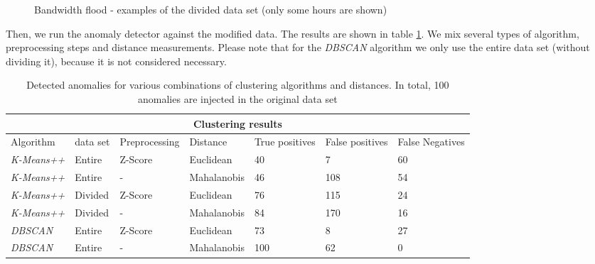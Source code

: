 \documentclass[12pt,a4paper,cucitura]{toptesi}
\begin{document}
\begin{figure}
\caption[Bandwidth flood - divided data set]{Bandwidth flood - examples of the divided data set (only some hours are shown)}
\end{figure}

Then, we run the anomaly detector against the modified data. The results are shown in table \ref{tab-flood}. We mix several types of algorithm, preprocessing steps and distance measurements.
Please note that for the \emph{DBSCAN} algorithm we only use the entire data set (without dividing it), because it is not considered necessary.

\begin{center}
\begin{table}
\begin{tabular}{l|l|l|l|p{1.5cm}|p{1.5cm}|p{1.5cm}}
\hline
\hline
\multicolumn{7}{c}{Clustering results} \\
\hline
Algorithm & data set & Preprocessing & Distance & True positives & False positives & False Negatives \\
\hline
\emph{K-Means++} & Entire & Z-Score & Euclidean & 40 & 7 & 60 \\
\emph{K-Means++} & Entire & - & Mahalanobis & 46 & 108 & 54 \\
\emph{K-Means++} & Divided & Z-Score & Euclidean & 76 & 115 & 24 \\
\emph{K-Means++} & Divided & - & Mahalanobis & 84 & 170 & 16 \\
\emph{DBSCAN} & Entire & Z-Score & Euclidean & 73 & 8 & 27 \\
\emph{DBSCAN} & Entire & - & Mahalanobis & 100 & 62 & 0 \\
\hline
\hline
\end{tabular}
\caption[Bandwidth flood - detected anomalies]{Detected anomalies for various combinations of clustering algorithms and distances. In total, 100 anomalies are injected in the original data set}
\label{tab-flood}
\end{table}
\end{center}
\end{document}
